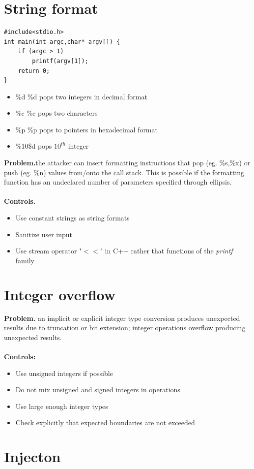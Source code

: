 \documentclass[10pt,a4paper]{article}
\begin{document}
\section{String format}
\begin{verbatim}
#include<stdio.h>
int main(int argc,char* argv[]) {
	if (argc > 1)
		printf(argv[1]);
	return 0;
}
\end{verbatim}
\begin{itemize}
\item \%d \%d pops two integers in decimal format
\item \%c \%c pops two characters
\item \%p \%p pops to pointers in hexadecimal format
\item \%10\$d pops $10^{th}$ integer
\end{itemize}
\textbf{Problem.}the attacker can insert formatting instructions that pop (eg. \%s,\%x) or push (eg. \%n) values from/onto the call stack. This is possible if the formatting function has an undeclared number of parameters specified through ellipsis.\\\\
\textbf{Controls.} 
\begin{itemize}
\item Use constant strings as string formats
\item Sanitize user input
\item Use stream operator "$<<$" in C++ rather that functions of the \emph{printf} family
\end{itemize}
\section{Integer overflow}
\textbf{Problem.} an implicit or explicit integer type conversion produces unexpected results due to truncation or bit extension; integer operations overflow producing unexpected results.\\\\
\textbf{Controls:}
\begin{itemize}
\item Use unsigned integers if possible
\item Do not mix unsigned and signed integers in operations
\item Use large enough integer types
\item Check explicitly that expected boundaries are not exceeded
\end{itemize}
\newpage
\section{Injecton}
\end{document}
